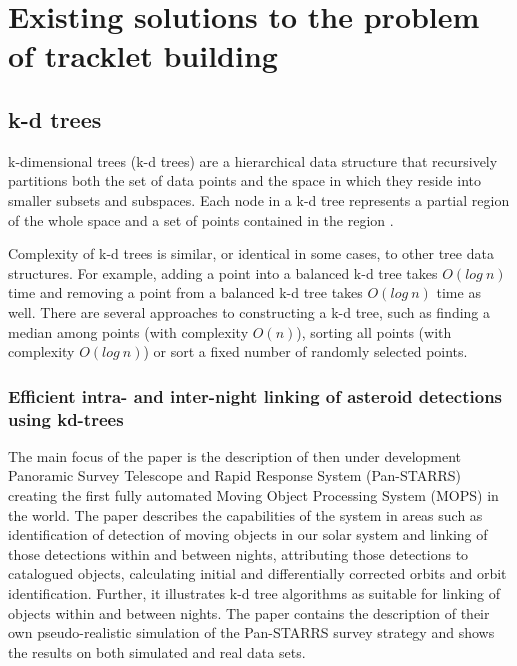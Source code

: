 \chapter{Existing solutions to the problem of tracklet building}\label{chap:existing_solutions}

\section{k-d trees}\label{sec:kd_trees}
	
	k-dimensional trees (k-d trees) are a hierarchical data structure that recursively partitions both the set of data points and the space in which they reside into smaller subsets and subspaces. Each node in a k-d tree represents a partial region of the whole space and a set of points contained in the region \citep{}.
	
	Complexity of k-d trees is similar, or identical in some cases, to other tree data structures. For example, adding a point into a balanced k-d tree takes $O(log\ n)$ time and removing a point from a balanced k-d tree takes $O(log\ n)$ time as well. There are several approaches to constructing a k-d tree, such as finding a median among points (with complexity $O(n)$), sorting all points (with complexity $O(log\ n)$) or sort a fixed number of randomly selected points.

\subsection{Efficient intra- and inter-night linking of asteroid detections using kd-trees}\label{subsec:intra_inter}

	The main focus of the paper is the description of then under development Panoramic Survey Telescope and Rapid Response System (Pan-STARRS) creating the first fully automated Moving Object Processing System (MOPS) in the world. The paper describes the capabilities of the system in areas such as identification of detection of moving objects in our solar system and linking of those detections within and between nights, attributing those detections to catalogued objects, calculating initial and differentially corrected orbits and orbit identification. Further, it illustrates k-d tree algorithms as suitable for linking of objects within and between nights. The paper contains the description of their own pseudo-realistic simulation of the Pan-STARRS survey strategy and shows the results on both simulated and real data sets.
	
